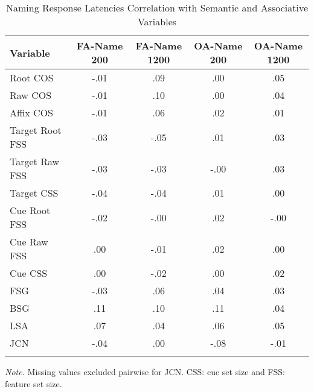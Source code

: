 \documentclass[english,man]{apa6}
\theoremstyle{definition}
\theoremstyle{definition}
\theoremstyle{definition}
\theoremstyle{remark}
\begin{document}
\begin{table}[tbp]
\begin{center}
\begin{threeparttable}
\caption{\label{tab:name-table}Naming Response Latencies Correlation with Semantic and Associative Variables}
\begin{tabular}{lcccc}
\toprule
Variable & \multicolumn{1}{c}{FA-Name 200} & \multicolumn{1}{c}{FA-Name 1200} & \multicolumn{1}{c}{OA-Name 200} & \multicolumn{1}{c}{OA-Name 1200}\\
\midrule
Root COS & -.01 & .09 & .00 & .05\\
Raw COS & -.01 & .10 & .00 & .04\\
Affix COS & -.01 & .06 & .02 & .01\\
Target Root FSS & -.03 & -.05 & .01 & .03\\
Target Raw FSS & -.03 & -.03 & -.00 & .03\\
Target CSS & -.04 & -.04 & .01 & .00\\
Cue Root FSS & -.02 & -.00 & .02 & -.00\\
Cue Raw FSS & .00 & -.01 & .02 & .00\\
Cue CSS & .00 & -.02 & .00 & .02\\
FSG & -.03 & .06 & .04 & .03\\
BSG & .11 & .10 & .11 & .04\\
LSA & .07 & .04 & .06 & .05\\
JCN & -.04 & .00 & -.08 & -.01\\
\bottomrule
\addlinespace
\end{tabular}
\begin{tablenotes}[para]
\textit{Note.} Missing values excluded pairwise for JCN. CSS: cue set size and FSS: feature set size.
\end{tablenotes}
\end{threeparttable}
\end{center}
\end{table}
\end{document}
